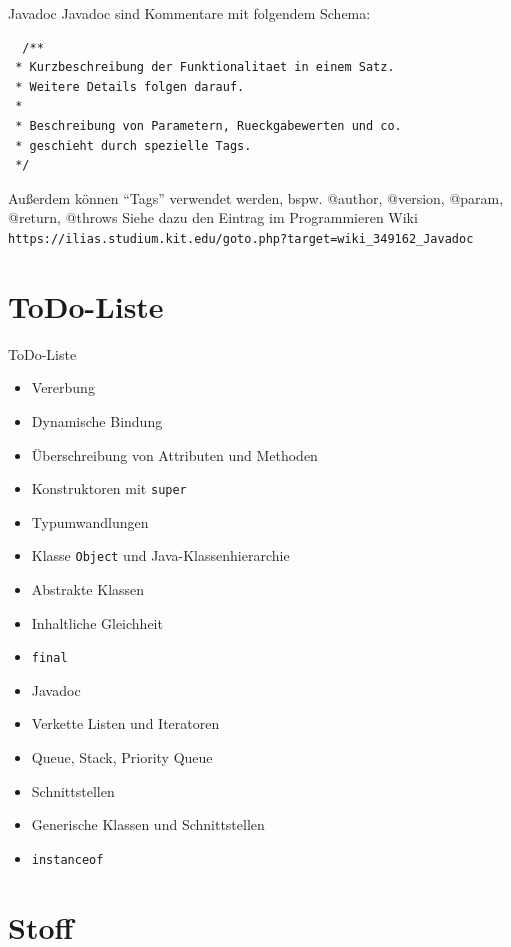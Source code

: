 \documentclass[18pt]{beamer}
\begin{document}
\begin{frame}[fragile]{Javadoc}
 Javadoc sind Kommentare mit folgendem Schema:
 \begin{lstlisting}
  /**
 * Kurzbeschreibung der Funktionalitaet in einem Satz.
 * Weitere Details folgen darauf.
 * 
 * Beschreibung von Parametern, Rueckgabewerten und co.
 * geschieht durch spezielle Tags.
 */
 \end{lstlisting}
Außerdem können ``Tags'' verwendet werden, bspw. @author, @version, @param, @return, @throws
Siehe dazu den Eintrag im Programmieren Wiki
\scriptsize
\verb|https://ilias.studium.kit.edu/goto.php?target=wiki_349162_Javadoc|
\end{frame}


\section{ToDo-Liste}
\begin{frame}[fragile]{ToDo-Liste}
\begin{itemize}
 \item Vererbung \checkmark
 \item Dynamische Bindung
 \item Überschreibung von Attributen und Methoden \checkmark
 \item Konstruktoren mit \verb|super| \checkmark
 \item Typumwandlungen 
 \item Klasse \verb|Object| und Java-Klassenhierarchie
 \item Abstrakte Klassen
 \item Inhaltliche Gleichheit
 \item \verb|final|
 \item Javadoc \checkmark
 \item Verkette Listen und Iteratoren
 \item Queue, Stack, Priority Queue
 \item Schnittstellen \checkmark
 \item Generische Klassen und Schnittstellen \checkmark
  \item \verb|instanceof|
\end{itemize}
\end{frame}



\section{Stoff}
\end{document}
